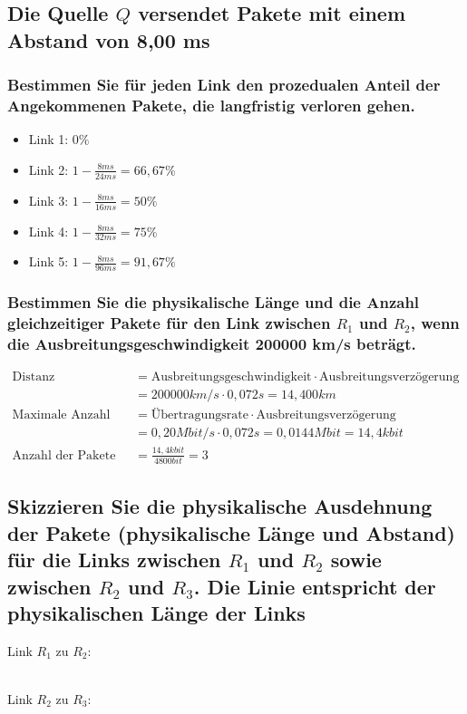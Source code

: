 \documentclass[a4paper, fleqn]{scrartcl}
\begin{document}
\subsection{Die Quelle $Q$ versendet Pakete mit einem Abstand von 8,00 ms}
\subsubsection{Bestimmen Sie für jeden Link den prozedualen Anteil der Angekommenen Pakete, die langfristig verloren gehen.}
\begin{itemize}
    \item Link 1: $0\%$
    \item Link 2: $1-\frac{8ms}{24ms}=66,67\%$
    \item Link 3: $1-\frac{8ms}{16ms}=50\%$
    \item Link 4: $1-\frac{8ms}{32ms}=75\%$
    \item Link 5: $1-\frac{8ms}{96ms}=91,67\%$
\end{itemize}
\subsubsection{Bestimmen Sie die physikalische Länge und die Anzahl gleichzeitiger Pakete für den Link zwischen $R_1$ und $R_2$, wenn die Ausbreitungsgeschwindigkeit 200000 km/s beträgt.}
\begin{align*}
    \text{Distanz} &= \text{Ausbreitungsgeschwindigkeit}\cdot\text{Ausbreitungsverzögerung}\\
    &= 200000km/s\cdot0,072s=14,400km\\
    \text{Maximale Anzahl Bits} &= \text{Übertragungsrate}\cdot\text{Ausbreitungsverzögerung}\\
    &= 0,20Mbit/s\cdot0,072s=0,0144Mbit=14,4kbit\\
    \text{Anzahl der Pakete} &= \frac{14,4kbit}{4800bit}=3
\end{align*}
\subsection{Skizzieren Sie die physikalische Ausdehnung der Pakete (physikalische Länge und Abstand) für die Links zwischen $R_1$ und $R_2$ sowie zwischen $R_2$ und $R_3$. Die Linie entspricht der physikalischen Länge der Links}
Link $R_1$ zu $R_2$:
\\
Link $R_2$ zu $R_3$:
\end{document}
